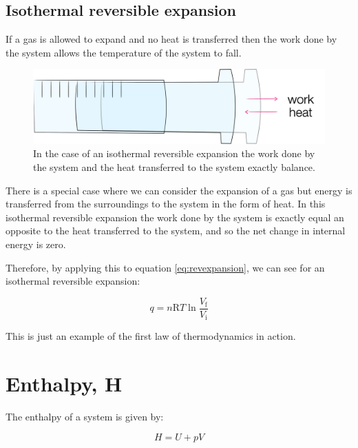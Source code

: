 \documentclass[
]{book}
\begin{document}
\hypertarget{isothermal-reversible-expansion}{%
\subsection{Isothermal reversible expansion}\label{isothermal-reversible-expansion}}

If a gas is allowed to expand and no heat is transferred then the work done by the system allows the temperature of the system to fall.

\begin{figure}

{\centering \includegraphics[width=0.5\linewidth]{images/isothermalexpansion} 

}

\caption{In the case of an isothermal reversible expansion the work done by the system and the heat transferred to the system exactly balance.}\label{fig:isothermalexpansion}
\end{figure}

There is a special case where we can consider the expansion of a gas but energy is transferred from the surroundings to the system in the form of heat. In this isothermal reversible expansion the work done by the system is exactly equal an opposite to the heat transferred to the system, and so the net change in internal energy is zero.

Therefore, by applying this to equation \eqref{eq:revexpansion}, we can see for an isothermal reversible expansion:

\begin{equation}
q=n\textrm{R}T \ln {\frac{V_\textrm{f}}{V_\textrm{i}}}
\label{eq:isothermalexpansion}
\end{equation}

This is just an example of the first law of thermodynamics in action.

\hypertarget{enthalpy-h}{%
\section{Enthalpy, H}\label{enthalpy-h}}

The enthalpy of a system is given by:

\begin{equation}
H = U+pV
\label{eq:enthalpy}
\end{equation}
\end{document}

